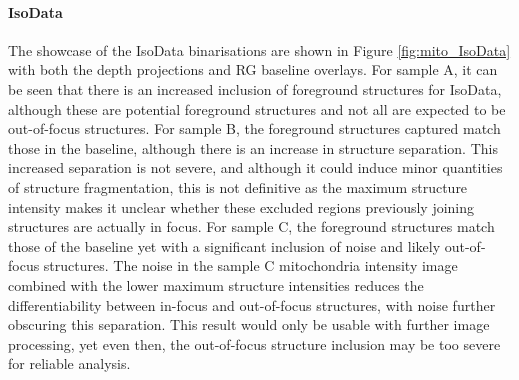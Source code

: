 \paragraph{IsoData}
The showcase of the IsoData binarisations are shown in Figure \ref{fig:mito_IsoData} with both the depth projections and RG baseline overlays. For sample A, it can be seen that there is an increased inclusion of foreground structures for IsoData, although these are potential foreground structures and not all are expected to be out-of-focus structures. For sample B, the foreground structures captured match those in the baseline, although there is an increase in structure separation. This increased separation is not severe, and although it could induce minor quantities of structure fragmentation, this is not definitive as the maximum structure intensity makes it unclear whether these excluded regions previously joining structures are actually in focus. For sample C, the foreground structures match those of the baseline yet with a significant inclusion of noise and likely out-of-focus structures. The noise in the sample C mitochondria intensity image combined with the lower maximum structure intensities reduces the differentiability between in-focus and out-of-focus structures, with noise further obscuring this separation. This result would only be usable with further image processing, yet even then, the out-of-focus structure inclusion may be too severe for reliable analysis.
